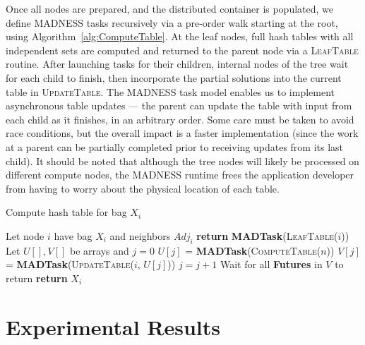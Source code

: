 \documentclass[conference]{IEEEtran}
\begin{document}
Once all nodes are prepared, and the distributed container is populated, we
define MADNESS tasks recursively via a pre-order walk starting at the root,
using Algorithm~\ref{alg:ComputeTable}.
At the leaf nodes, full hash tables with all independent sets are computed and returned
to the parent node via a \textsc{LeafTable} routine. After launching tasks for their children,
internal nodes of the tree wait for each child to finish, then incorporate the partial solutions
into the current table in \textsc{UpdateTable}. %
The MADNESS task model enables us to
implement asynchronous table updates --- the parent can update the table with
input from each child as it finishes, in an arbitrary order. Some care
must be taken to avoid race conditions, but the overall impact is
a faster implementation (since the work at a parent can be partially
completed prior to receiving updates from its last child). It should be noted that
although the tree nodes will likely be processed on different compute nodes,
the MADNESS runtime frees the application developer from having to
worry about the physical location of each table.

\begin{algorithm}[ht!]
\caption{Compute hash table for bag $X_{i}$}\label{alg:ComputeTable}
\begin{algorithmic}[1]
\State Let node $i$ have bag $X_i$ and neighbors $Adj_i$
\State \textbf{return} \textbf{MADTask}(\textsc{LeafTable}($i$))
\EndIf
\State Let $U[], V[]$ be arrays and $j = 0$
\State $U[j]$ = \textbf{MADTask}(\textsc{ComputeTable}($n$))
\State $V[j]$ = \textbf{MADTask}(\textsc{UpdateTable}($i$, $U[j]$))
\State $j = j + 1$
\EndFor
\State Wait for all \textbf{Futures} in $V$ to return
\State \textbf{return} $X_{i}$
\EndProcedure
\end{algorithmic}
\end{algorithm}

\section{Experimental Results}~\label{sec:experiments}
\end{document}
